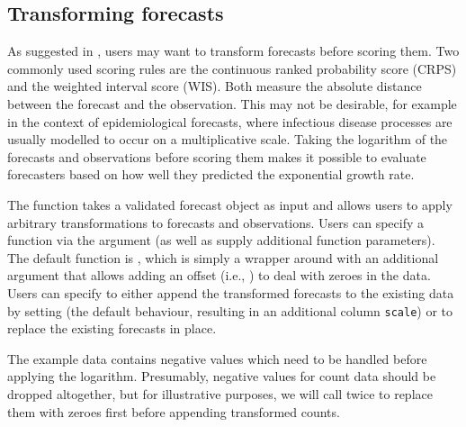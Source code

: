 \documentclass[
]{jss}
\begin{document}
\subsection{Transforming forecasts}\label{transforming-forecasts}

As suggested in \cite{bosseScoringEpidemiologicalForecasts2023}, users
may want to transform forecasts before scoring them. Two commonly used
scoring rules are the continuous ranked probability score (CRPS) and the
weighted interval score (WIS). Both measure the absolute distance
between the forecast and the observation. This may not be desirable, for
example in the context of epidemiological forecasts, where infectious
disease processes are usually modelled to occur on a multiplicative
scale. Taking the logarithm of the forecasts and observations before
scoring them makes it possible to evaluate forecasters based on how well
they predicted the exponential growth rate.

The function  takes a validated forecast
object as input and allows users to apply arbitrary transformations to
forecasts and observations. Users can specify a function via the
argument  (as well as supply additional function parameters).
The default function is , which is simply a wrapper
around  with an additional argument that allows adding an
offset (i.e., ) to deal with zeroes in the data.
Users can specify to either append the transformed forecasts to the
existing data by setting  (the default behaviour,
resulting in an additional column \texttt{scale}) or to replace the
existing forecasts in place.

The example data contains negative values which need to be handled
before applying the logarithm. Presumably, negative values for count
data should be dropped altogether, but for illustrative purposes, we
will call  twice to replace them with
zeroes first before appending transformed counts.
\end{document}
